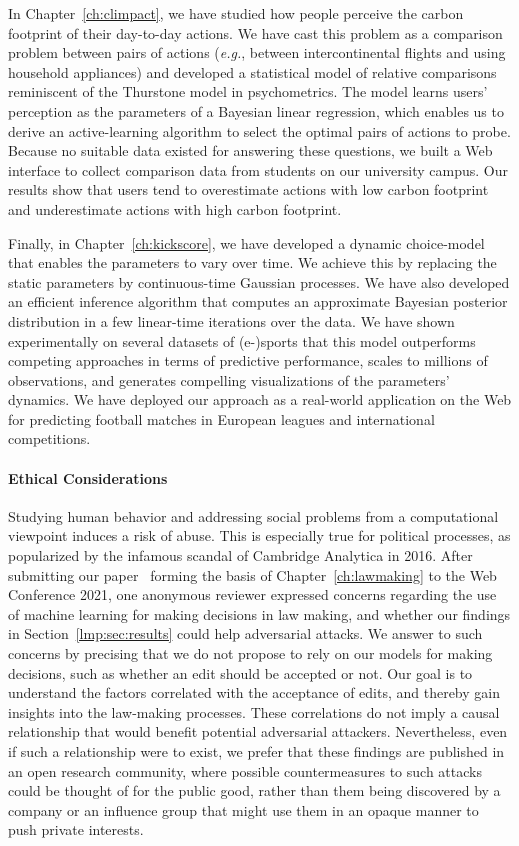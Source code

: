 In Chapter~\ref{ch:climpact}, we have studied how people perceive the carbon footprint of their day-to-day actions.
We have cast this problem as a comparison problem between pairs of actions (\textit{e.g.}, between intercontinental flights and using household appliances) and developed a statistical model of relative comparisons reminiscent of the Thurstone model in psychometrics.
The model learns users' perception as the parameters of a Bayesian linear regression, which enables us to derive an active-learning algorithm to select the optimal pairs of actions to probe.
Because no suitable data existed for answering these questions, we built a Web interface to collect comparison data from students on our university campus.
Our results show that users tend to overestimate actions with low carbon footprint and underestimate actions with high carbon footprint.

Finally, in Chapter~\ref{ch:kickscore}, we have developed a dynamic choice-model that enables the parameters to vary over time.
We achieve this by replacing the static parameters by continuous-time Gaussian processes.
We have also developed an efficient inference algorithm that computes an approximate Bayesian posterior distribution in a few linear-time iterations over the data.
We have shown experimentally on several datasets of (e-)sports that this model outperforms competing approaches in terms of predictive performance, scales to millions of observations, and generates compelling visualizations of the parameters' dynamics.
We have deployed our approach as a real-world application on the Web for predicting football matches in European leagues and international competitions.

\paragraph{Ethical Considerations}
Studying human behavior and addressing social problems from a computational viewpoint induces a risk of abuse.
This is especially true for political processes, as popularized by the infamous scandal of Cambridge Analytica in 2016.
After submitting our paper~\citep{kristof2021war} forming the basis of Chapter~\ref{ch:lawmaking} to the Web Conference 2021, one anonymous reviewer expressed concerns regarding the use of machine learning for making decisions in law making, and whether our findings in Section~\ref{lmp:sec:results} could help adversarial attacks.
We answer to such concerns by precising that we do not propose to rely on our models for making decisions, such as whether an edit should be accepted or not.
Our goal is to understand the factors correlated with the acceptance of edits, and thereby gain insights into the law-making processes.
These correlations do not imply a causal relationship that would benefit potential adversarial attackers.
Nevertheless, even if such a relationship were to exist, we prefer that these findings are published in an open research community, where possible countermeasures to such attacks could be thought of for the public good, rather than them being discovered by a company or an influence group that might use them in an opaque manner to push private interests.

